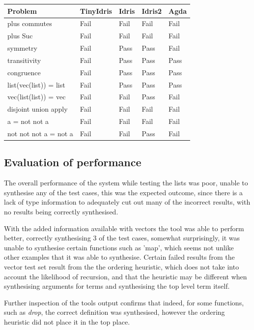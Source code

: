 \documentclass[a4paper]{article}
\begin{document}
\begin{center}
\begin{tabular}{lllll}
Problem & TinyIdris & Idris & Idris2 & Agda\\
\hline
plus commutes & Fail & Fail & Fail & Fail\\
plus Suc & Fail & Fail & Fail & Fail\\
symmetry & Fail & Pass & Pass & Fail\\
transitivity & Fail & Pass & Pass & Pass\\
congruence & Fail & Pass & Pass & Pass\\
list(vec(list)) = list & Fail & Pass & Pass & Pass\\
vec(list(list)) = vec & Fail & Fail & Pass & Fail\\
disjoint union apply & Fail & Fail & Fail & Fail\\
a = not not a & Fail & Fail & Fail & Fail\\
not not not a = not a & Fail & Fail & Pass & Fail\\
\end{tabular}
\end{center}

\subsection{Evaluation of performance}
\label{sec:org4c9aa94}
The overall performance of the system while testing 
the lists was poor, unable to synthesise any of the 
test cases, this was the expected outcome, since
there is a lack of type information to adequately cut out 
many of the incorrect results, with no results being correctly 
synthesised. 

With the added information available with vectors the tool was 
able to perform better, correctly synthesising 3 of the test cases,
somewhat surprisingly, it was unable to synthesise certain functions
such as 'map', which seems not unlike other examples that it was able 
to synthesise. Certain failed results from the vector test set result
from the the ordering heuristic, which does not take into account the
likelihood of recursion, and that the heuristic may be different
when synthesising arguments for terms and synthesising the top level
term itself.

Further inspection of the tools output confirms that indeed, for some
functions, such as \textit{drop}, the correct definition was
synthesised, however the ordering heuristic did not place it in the
top place. 
\end{document}
